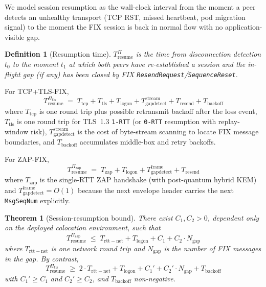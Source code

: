 \documentclass[11pt,a4paper]{article}
\newtheorem{theorem}{Theorem}
\newtheorem{definition}{Definition}
\begin{document}
We model session resumption as the wall-clock interval from the
moment a peer detects an unhealthy transport (TCP RST, missed
heartbeat, pod migration signal) to the moment the FIX session is
back in normal flow with no application-visible gap.

\begin{definition}[Resumption time]
$T_{\mathrm{resume}}^\Pi$ is the time from disconnection detection
$t_0$ to the moment $t_1$ at which both peers have re-established a
session and the in-flight gap (if any) has been closed by FIX
\texttt{ResendRequest}/\texttt{SequenceReset}.
\end{definition}

For TCP+TLS-FIX,
\begin{equation}
  T_{\mathrm{resume}}^{\Pi_{\mathrm{tls}}}
   \;=\;
   T_{\mathrm{tcp}} + T_{\mathrm{tls}} + T_{\mathrm{logon}}
   + T_{\mathrm{gapdetect}}^{\mathrm{stream}} + T_{\mathrm{resend}}
   + T_{\mathrm{backoff}}
  \label{eq:tls-resume}
\end{equation}
where $T_{\mathrm{tcp}}$ is one round trip plus possible retransmit
backoff after the loss event, $T_{\mathrm{tls}}$ is one round trip
for TLS~1.3 \texttt{1-RTT} (or \texttt{0-RTT} resumption with
replay-window risk), $T_{\mathrm{gapdetect}}^{\mathrm{stream}}$ is
the cost of byte-stream scanning to locate FIX message boundaries,
and $T_{\mathrm{backoff}}$ accumulates middle-box and retry
backoffs.

For ZAP-FIX,
\begin{equation}
  T_{\mathrm{resume}}^{\Pi_{\mathrm{zap}}}
   \;=\;
   T_{\mathrm{zap}} + T_{\mathrm{logon}}
   + T_{\mathrm{gapdetect}}^{\mathrm{frame}} + T_{\mathrm{resend}}
  \label{eq:zap-resume}
\end{equation}
where $T_{\mathrm{zap}}$ is the single-RTT ZAP handshake (with
post-quantum hybrid KEM) and
$T_{\mathrm{gapdetect}}^{\mathrm{frame}} = O(1)$ because the next
envelope header carries the next \texttt{MsgSeqNum} explicitly.

\begin{theorem}[Session-resumption bound]
\label{thm:resume}
There exist $C_1, C_2 > 0$, dependent only on the deployed
colocation environment, such that
\[
  T_{\mathrm{resume}}^{\Pi_{\mathrm{zap}}}
   \;\leq\;
   T_{\mathrm{rtt-net}} + T_{\mathrm{logon}}
   + C_1 + C_2 \cdot N_{\mathrm{gap}}
\]
where $T_{\mathrm{rtt-net}}$ is one network round trip and
$N_{\mathrm{gap}}$ is the number of FIX messages in the gap.
By contrast,
\[
  T_{\mathrm{resume}}^{\Pi_{\mathrm{tls}}}
   \;\geq\;
   2 \cdot T_{\mathrm{rtt-net}} + T_{\mathrm{logon}}
   + C_1' + C_2' \cdot N_{\mathrm{gap}}
   + T_{\mathrm{backoff}}
\]
with $C_1' \geq C_1$ and $C_2' \geq C_2$, and $T_{\mathrm{backoff}}$
non-negative.
\end{theorem}
\end{document}
